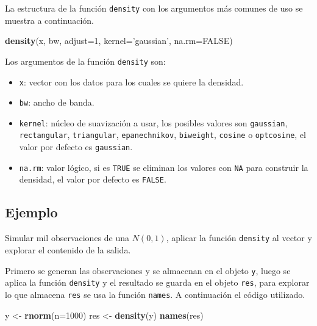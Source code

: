\documentclass[10pt,]{krantz}
\makeatletter
\newenvironment{Shaded}{\begin{snugshade}}{\end{snugshade}}
\newcommand{\KeywordTok}[1]{\textcolor[rgb]{0.13,0.29,0.53}{\textbf{#1}}}
\newcommand{\DataTypeTok}[1]{\textcolor[rgb]{0.13,0.29,0.53}{#1}}
\newcommand{\DecValTok}[1]{\textcolor[rgb]{0.00,0.00,0.81}{#1}}
\newcommand{\StringTok}[1]{\textcolor[rgb]{0.31,0.60,0.02}{#1}}
\newcommand{\OtherTok}[1]{\textcolor[rgb]{0.56,0.35,0.01}{#1}}
\newcommand{\NormalTok}[1]{#1}
\providecommand{\tightlist}{%
  \setlength{\itemsep}{0pt}\setlength{\parskip}{0pt}}
\newenvironment{kframe}{%
\medskip{}
\setlength{\fboxsep}{.8em}
 \def\at@end@of@kframe{}%
 \ifinner\ifhmode%
  \def\at@end@of@kframe{\end{minipage}}%
  \begin{minipage}{\columnwidth}%
 \fi\fi%
 \def\FrameCommand##1{\hskip\@totalleftmargin \hskip-\fboxsep
 \colorbox{shadecolor}{##1}\hskip-\fboxsep
     \hskip-\linewidth \hskip-\@totalleftmargin \hskip\columnwidth}%
 \MakeFramed {\advance\hsize-\width
   \@totalleftmargin\z@ \linewidth\hsize
   \@setminipage}}%
 {\par\unskip\endMakeFramed%
 \at@end@of@kframe}
\renewenvironment{Shaded}{\begin{kframe}}{\end{kframe}}
\makeatother
\begin{document}
La estructura de la función \texttt{density} con los argumentos más
comunes de uso se muestra a continuación.

\begin{Shaded}
\begin{Highlighting}[]
\KeywordTok{density}\NormalTok{(x, bw, }\DataTypeTok{adjust=}\DecValTok{1}\NormalTok{, }\DataTypeTok{kernel=}\StringTok{'gaussian'}\NormalTok{, }\DataTypeTok{na.rm=}\OtherTok{FALSE}\NormalTok{)}
\end{Highlighting}
\end{Shaded}

Los argumentos de la función \texttt{density} son:

\begin{itemize}
\tightlist
\item
  \texttt{x}: vector con los datos para los cuales se quiere la
  densidad.
\item
  \texttt{bw}: ancho de banda.
\item
  \texttt{kernel}: núcleo de suavización a usar, los posibles valores
  son \texttt{gaussian}, \texttt{rectangular}, \texttt{triangular},
  \texttt{epanechnikov}, \texttt{biweight}, \texttt{cosine} o
  \texttt{optcosine}, el valor por defecto es \texttt{gaussian}.
\item
  \texttt{na.rm}: valor lógico, si es \texttt{TRUE} se eliminan los
  valores con \texttt{NA} para construir la densidad, el valor por
  defecto es \texttt{FALSE}.
\end{itemize}

\subsection*{Ejemplo}\label{ejemplo-6}


Simular mil observaciones de una \(N(0, 1)\), aplicar la función
\texttt{density} al vector y explorar el contenido de la salida.

Primero se generan las observaciones y se almacenan en el objeto
\texttt{y}, luego se aplica la función \texttt{density} y el resultado
se guarda en el objeto \texttt{res}, para explorar lo que almacena
\texttt{res} se usa la función \texttt{names}. A continuación el código
utilizado.

\begin{Shaded}
\begin{Highlighting}[]
\NormalTok{y <-}\StringTok{ }\KeywordTok{rnorm}\NormalTok{(}\DataTypeTok{n=}\DecValTok{1000}\NormalTok{)}
\NormalTok{res <-}\StringTok{ }\KeywordTok{density}\NormalTok{(y)}
\KeywordTok{names}\NormalTok{(res)}
\end{Highlighting}
\end{Shaded}
\end{document}
